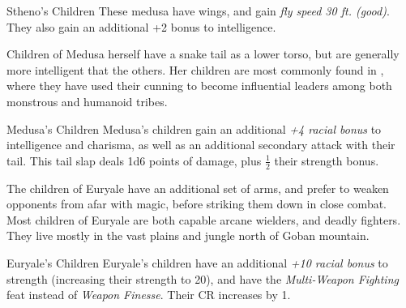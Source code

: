 \begin{35e}{Stheno's Children}
  These medusa have wings, and gain \emph{fly speed 30 ft. (good)}. They also
  gain an additional +2 bonus to intelligence.
\end{35e}

Children of Medusa herself have a snake tail as a lower torso, but are
generally more intelligent that the others. Her children are most commonly
found in , where they have used their cunning to become
influential leaders among both monstrous and humanoid tribes.

\begin{35e}{Medusa's Children}
  Medusa's children gain an additional \emph{+4 racial bonus} to intelligence
  and charisma, as well as an additional secondary attack with their tail.
  This tail slap deals 1d6 points of damage, plus $ \frac{1}{2} $ their strength
  bonus.
\end{35e}

The children of Euryale have an additional set of arms, and prefer to weaken
opponents from afar with magic, before striking them down in close combat.
Most children of Euryale are both capable arcane wielders, and deadly
fighters. They live mostly in the vast plains and jungle north of Goban
mountain.

\begin{35e}{Euryale's Children}
  Euryale's children have an additional \emph{+10 racial bonus} to strength
  (increasing their strength to 20), and have the \emph{Multi-Weapon Fighting}
  feat instead of \emph{Weapon Finesse}. Their CR increases by 1.
\end{35e}
